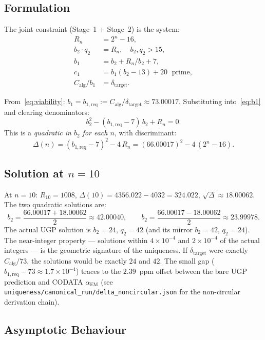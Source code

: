 \documentclass[11pt]{article}
\theoremstyle{remark}
\newcommand{\bone}{b_1}
\newcommand{\btwo}{b_2}
\newcommand{\qtwo}{q_2}
\newcommand{\cone}{c_1}
\newcommand{\bonereq}{b_{1,\mathrm{req}}}
\newcommand{\deltatar}{\delta_{\mathrm{target}}}
\newcommand{\Calg}{C_{\mathrm{alg}}}
\begin{document}
\subsection{Formulation}

The joint constraint (Stage~1 $+$ Stage~2) is the system:
\begin{align}
  R_n &= 2^n - 16, \label{eq:Rn} \\
  \btwo \cdot \qtwo &= R_n, \quad \btwo, \qtwo > 15, \label{eq:divpair} \\
  \bone &= \btwo + R_n/\btwo + 7, \label{eq:b1} \\
  \cone &= \bone(\btwo - 13) + 20 \;\text{ prime}, \label{eq:primelock} \\
  \Calg / \bone &= \deltatar. \label{eq:viability}
\end{align}

From~\eqref{eq:viability}: $\bone = \bonereq := \Calg/\deltatar \approx 73.00017$.
Substituting into~\eqref{eq:b1} and clearing denominators:
\begin{equation}
  \boxed{\btwo^2 - (\bonereq - 7)\,\btwo + R_n = 0.}
  \label{eq:quadratic}
\end{equation}
This is a \emph{quadratic in $\btwo$ for each $n$}, with discriminant:
\[
  \Delta(n) = (\bonereq - 7)^2 - 4\,R_n
            = (66.00017)^2 - 4\,(2^n - 16).
\]

\subsection{Solution at $n=10$}

At $n{=}10$: $R_{10} = 1008$, $\Delta(10) = 4356.022 - 4032 = 324.022$,
$\sqrt{\Delta} \approx 18.00062$.
The two quadratic solutions are:
\[
  \btwo = \frac{66.00017 + 18.00062}{2} \approx 42.00040,
  \qquad
  \btwo = \frac{66.00017 - 18.00062}{2} \approx 23.99978.
\]
The actual UGP solution is $\btwo = 24$, $\qtwo = 42$ (and its mirror $\btwo = 42$,
$\qtwo = 24$).
The near-integer property --- solutions within $4{\times}10^{-4}$ and
$2{\times}10^{-4}$ of the actual integers --- is the geometric signature of the
uniqueness.
If $\deltatar$ were exactly $\Calg/73$, the solutions would be exactly $24$ and $42$.
The small gap ($\bonereq - 73 \approx 1.7{\times}10^{-4}$) traces to the
$2.39$~ppm offset between the bare UGP prediction and CODATA $\alpha_{\mathrm{EM}}$
(see \texttt{uniqueness/canonical\_run/\allowbreak delta\_noncircular.json} for the
non-circular derivation chain).

\subsection{Asymptotic Behaviour}
\label{subsec:asymptotic}
\end{document}
